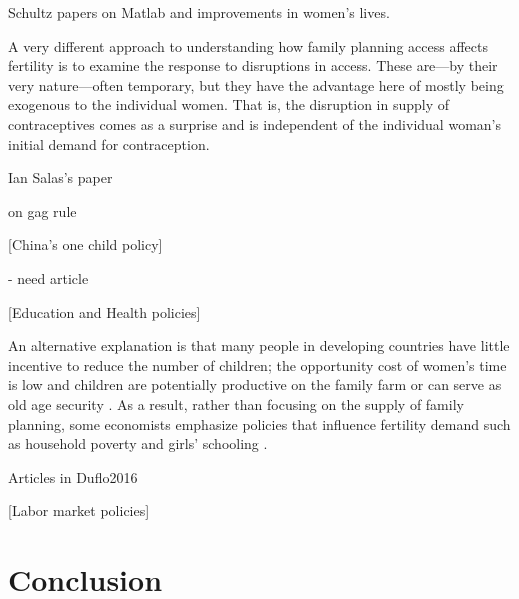 \documentclass[letterpaper,12pt]{article}
\begin{document}
\citet{Newman1988}

\citet{Newman1984}

\citet{Feyisetan1996}

\citet{Miller2016}

\citet{Desai2011}

\citet{Molyneaux2000}

\citep{Singh2012}

Schultz papers on Matlab and improvements in women's lives.

A very different approach to understanding how family planning access
affects fertility is to examine the response to disruptions in access.
These are---by their very nature---often temporary, but they have
the advantage here of mostly being exogenous to the individual women.
That is, the disruption in supply of contraceptives comes as a
surprise and is independent of the individual woman's initial
demand for contraception.

\citet{Dumas2017}

Ian Salas's paper 

\citet{Jones2015} on gag rule


[China's one child policy]

\citet{Rosenzweig2009} - need article

[Education and Health policies]

An alternative explanation is that many people in developing countries 
have little incentive to reduce the number of children;
the opportunity cost of women's time is low and children are potentially 
productive on the family farm or can serve as old age security
\citep{Banerjee2014,Lambert2016}.
As a result, rather than focusing on the supply of family planning, 
some economists emphasize policies that influence fertility demand 
such as household poverty and girls' schooling 
\citep{pritchett94a,DasGupta2011}.

Articles in Duflo2016

\citet{Ainsworth1996}

[Labor market policies]


\section{Conclusion}




\end{document}
